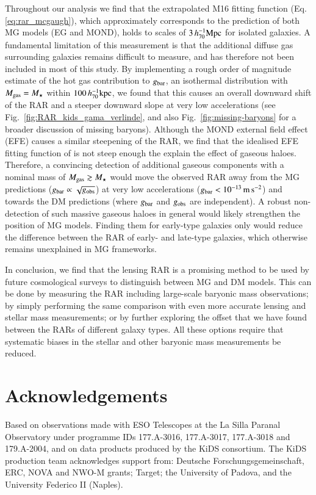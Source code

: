 \documentclass{aa}
\newcommand{\hkpc}{\,h_{70}^{-1}{\rm{kpc}} }
\newcommand{\hMpc}{\,h_{70}^{-1}{\rm{Mpc}} }
\newcommand{\mpss}{\,{\rm m}\,{\rm s}^{-2} }
\newcommand{\un}[1]{_{\rm #1}}
\begin{document}
Throughout our analysis we find that the extrapolated M16 fitting function (Eq. \ref{eq:rar_mcgaugh}), which approximately corresponds to the prediction of both MG models (EG and MOND), holds to scales of $3 \hMpc$ for isolated galaxies. A fundamental limitation of this measurement is that the additional diffuse gas surrounding galaxies remains difficult to measure, and has therefore not been included in most of this study. By implementing a rough order of magnitude estimate of the hot gas contribution to $g\un{bar}$, an isothermal distribution with $M\un{gas} = M_\star$ within $100 \hkpc$, we found that this causes an overall downward shift of the RAR and a steeper downward slope at very low accelerations (see Fig.~\ref{fig:RAR_kids_gama_verlinde}, and also Fig.~\ref{fig:missing-baryons} for a broader discussion of missing baryons). Although the MOND external field effect (EFE) causes a similar steepening of the RAR, we find that the idealised EFE fitting function of \cite{chae2020} is not steep enough the explain the effect of gaseous haloes. Therefore, a convincing detection of additional gaseous components with a nominal mass of $M\un{gas} \gtrsim M_\star$ would move the observed RAR away from the MG predictions ($g\un{bar} \propto \sqrt{g\un{obs}}$) at very low accelerations ($g\un{bar}<10^{-13} \mpss$) and towards the DM predictions (where $g\un{bar}$ and $g\un{obs}$ are independent). A robust non-detection of such massive gaseous haloes in general would likely strengthen the position of MG models. Finding them for early-type galaxies only would reduce the difference between the RAR of early- and late-type galaxies, which otherwise remains unexplained in MG frameworks.

In conclusion, we find that the lensing RAR is a promising method to be used by future cosmological surveys to distinguish between MG and DM models. This can be done by measuring the RAR including large-scale baryonic mass observations; by simply performing the same comparison with even more accurate lensing and stellar mass measurements; or by further exploring the offset that we have found between the RARs of different galaxy types. All these options require that systematic biases in the stellar and other baryonic mass measurements be reduced.


\section*{Acknowledgements}

Based on observations made with ESO Telescopes at the La Silla Paranal Observatory under programme IDs 177.A-3016, 177.A-3017, 177.A-3018 and 179.A-2004, and on data products produced by the KiDS consortium. The KiDS production team acknowledges support from: Deutsche Forschungsgemeinschaft, ERC, NOVA and NWO-M grants; Target; the University of Padova, and the University Federico II (Naples).
\end{document}
